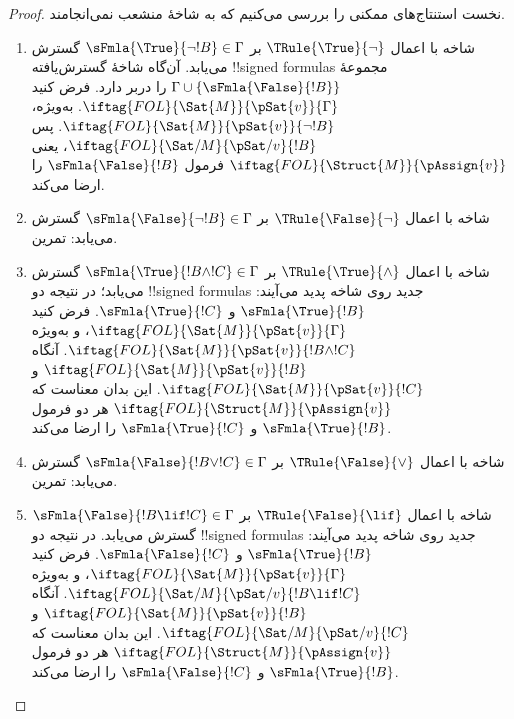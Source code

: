 \documentclass[../../../include/open-logic-section]{subfiles}
\begin{document}
\begin{proof}
نخست استنتاج‌های ممکنی را بررسی می‌کنیم که به شاخهٔ منشعب نمی‌انجامند.
\begin{enumerate}
\item شاخه با اعمال $\TRule{\True}{\lnot}$ بر
  $\sFmla{\True}{\lnot !B} \in \Gamma$ گسترش می‌یابد. آن‌گاه شاخهٔ
  گسترش‌یافته !!{signed formula}s مجموعهٔ $\Gamma \cup
  \{\sFmla{\False}{!B}\}$ را دربر دارد. فرض کنید
  $\iftag{FOL}{\Sat{M}}{\pSat{v}}{\Gamma}$. به‌ویژه،
  $\iftag{FOL}{\Sat{M}}{\pSat{v}}{\lnot !B}$. پس
  $\iftag{FOL}{\Sat/{M}}{\pSat/{v}}{!B}$، یعنی
  $\iftag{FOL}{\Struct{M}}{\pAssign{v}}$ فرمول
  $\sFmla{\False}{!B}$ را ارضا می‌کند.
\item شاخه با اعمال $\TRule{\False}{\lnot}$ بر
  $\sFmla{\False}{\lnot !B} \in \Gamma$ گسترش می‌یابد: تمرین.
\item شاخه با اعمال $\TRule{\True}{\land}$ بر
  $\sFmla{\True}{!B \land !C} \in \Gamma$ گسترش می‌یابد؛ در نتیجه دو
  !!{signed formula}s جدید روی شاخه پدید می‌آیند:
  $\sFmla{\True}{!B}$ و $\sFmla{\True}{!C}$. فرض کنید
  $\iftag{FOL}{\Sat{M}}{\pSat{v}}{\Gamma}$، و به‌ویژه
  $\iftag{FOL}{\Sat{M}}{\pSat{v}}{!B \land !C}$. آنگاه
  $\iftag{FOL}{\Sat{M}}{\pSat{v}}{!B}$ و
  $\iftag{FOL}{\Sat{M}}{\pSat{v}}{!C}$. این بدان معناست که
  $\iftag{FOL}{\Struct{M}}{\pAssign{v}}$ هر دو فرمول
  $\sFmla{\True}{!B}$ و $\sFmla{\True}{!C}$ را ارضا می‌کند.
\item شاخه با اعمال $\TRule{\False}{\lor}$ بر
  $\sFmla{\False}{!B \lor !C} \in \Gamma$ گسترش می‌یابد: تمرین.
\item شاخه با اعمال $\TRule{\False}{\lif}$ بر
  $\sFmla{\False}{!B \lif !C} \in \Gamma$ گسترش می‌یابد. در نتیجه دو
  !!{signed formula}s جدید روی شاخه پدید می‌آیند:
  $\sFmla{\True}{!B}$ و $\sFmla{\False}{!C}$. فرض کنید
  $\iftag{FOL}{\Sat{M}}{\pSat{v}}{\Gamma}$، و به‌ویژه
  $\iftag{FOL}{\Sat/{M}}{\pSat/{v}}{!B \lif !C}$. آنگاه
  $\iftag{FOL}{\Sat{M}}{\pSat{v}}{!B}$ و
  $\iftag{FOL}{\Sat/{M}}{\pSat/{v}}{!C}$. این بدان معناست که
  $\iftag{FOL}{\Struct{M}}{\pAssign{v}}$ هر دو فرمول
  $\sFmla{\True}{!B}$ و $\sFmla{\False}{!C}$ را ارضا می‌کند.

\end{enumerate}
\end{proof}
\end{document}

